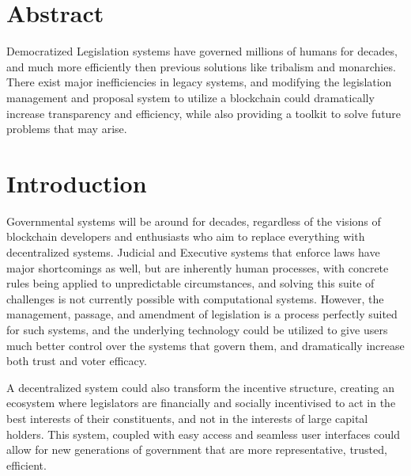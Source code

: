 \documentclass[letterpaper,twocolumn]{article}
\begin{document}

\section*{Abstract}
	Democratized Legislation systems have governed millions of humans for decades, and much more efficiently then previous solutions like tribalism and monarchies.  There exist major inefficiencies in legacy systems, and modifying the legislation management and proposal system to utilize a blockchain could dramatically increase transparency and efficiency, while also providing a toolkit to solve future problems that may arise.
\section*{Introduction}
	Governmental systems will be around for decades, regardless of the visions of blockchain developers and enthusiasts who aim to replace everything with decentralized systems.  Judicial and Executive systems that enforce laws have major shortcomings as well, but are inherently human processes, with concrete rules being applied to unpredictable circumstances, and solving this suite of challenges is not currently possible with computational systems.  However, the management, passage, and amendment of legislation is a process perfectly suited for such systems, and the underlying technology could be utilized to give users much better control over the systems that govern them, and dramatically increase both trust and voter efficacy.
	
	A decentralized system could also transform the incentive structure, creating an ecosystem where legislators are financially and socially incentivised to act in the best interests of their constituents, and not in the interests of large capital holders.  This system, coupled with easy access and seamless user interfaces could allow for new generations of government that are more representative, trusted, efficient.
\end{document}
